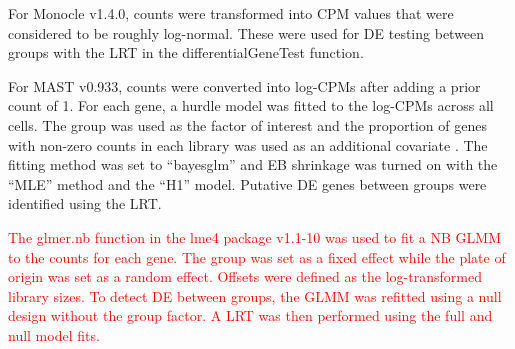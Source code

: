 \documentclass{article}
\newcommand\revised[1]{\textcolor{red}{#1}}
\begin{document}
For Monocle v1.4.0, counts were transformed into CPM values that were considered to be roughly log-normal.
These were used for DE testing between groups with the LRT in the differentialGeneTest function.

For MAST v0.933, counts were converted into log-CPMs after adding a prior count of 1.
For each gene, a hurdle model was fitted to the log-CPMs across all cells. 
The group was used as the factor of interest and the proportion of genes with non-zero counts in each library was used as an additional covariate \citep{finak2015mast}.
The fitting method was set to ``bayesglm'' and EB shrinkage was turned on with the ``MLE'' method and the ``H1'' model.
Putative DE genes between groups were identified using the LRT.

\revised{The glmer.nb function in the lme4 package v1.1-10 was used to fit a NB GLMM to the counts for each gene.
The group was set as a fixed effect while the plate of origin was set as a random effect.
Offsets were defined as the log-transformed library sizes.
To detect DE between groups, the GLMM was refitted using a null design without the group factor.
A LRT was then performed using the full and null model fits.}
\end{document}
